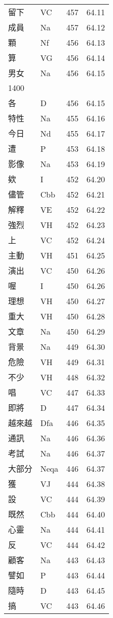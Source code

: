 \documentclass[twocolumn]{book}
\begin{document}
\begin{supertabular}{llrr}
留下 & VC & 457 &  64.11\\
成員 & Na & 457 &  64.12\\
顆 & Nf & 456 &  64.13\\
算 & VG & 456 &  64.14\\
男女 & Na & 456 &  64.15\\
1400\\
各 & D & 456 &  64.15\\
特性 & Na & 455 &  64.16\\
今日 & Nd & 455 &  64.17\\
遭 & P & 453 &  64.18\\
影像 & Na & 453 &  64.19\\
欸 & I & 452 &  64.20\\
儘管 & Cbb & 452 &  64.21\\
解釋 & VE & 452 &  64.22\\
強烈 & VH & 452 &  64.23\\
上 & VC & 452 &  64.24\\
主動 & VH & 451 &  64.25\\
演出 & VC & 450 &  64.26\\
喔 & I & 450 &  64.26\\
理想 & VH & 450 &  64.27\\
重大 & VH & 450 &  64.28\\
文章 & Na & 450 &  64.29\\
背景 & Na & 449 &  64.30\\
危險 & VH & 449 &  64.31\\
不少 & VH & 448 &  64.32\\
唱 & VC & 447 &  64.33\\
即將 & D & 447 &  64.34\\
越來越 & Dfa & 446 &  64.35\\
通訊 & Na & 446 &  64.36\\
考試 & Na & 446 &  64.37\\
大部分 & Neqa & 446 &  64.37\\
獲 & VJ & 444 &  64.38\\
設 & VC & 444 &  64.39\\
既然 & Cbb & 444 &  64.40\\
心靈 & Na & 444 &  64.41\\
反 & VC & 444 &  64.42\\
顧客 & Na & 443 &  64.43\\
譬如 & P & 443 &  64.44\\
隨時 & D & 443 &  64.45\\
搞 & VC & 443 &  64.46\\

\end{supertabular}
\end{document}
